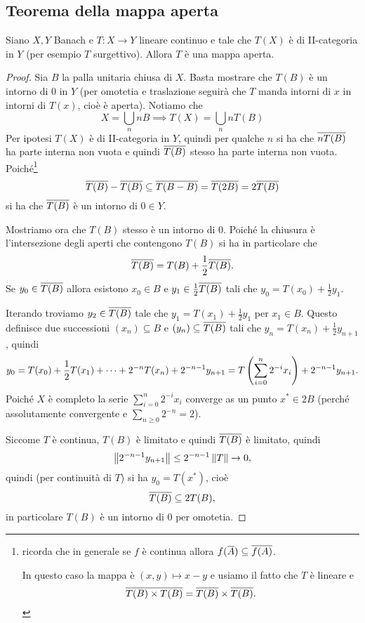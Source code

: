 \subsection{Teorema della mappa aperta}
\begin{theorem}\label{ThMappaAperta}
Siano $X,Y$ Banach e $T:X\to Y$ lineare continuo e tale che $T(X)$ \`e di II-categoria in $Y$ (per esempio $T$ surgettivo). Allora $T$ \`e una mappa aperta.
\end{theorem}
\begin{proof}
Sia $B$ la palla unitaria chiusa di $X$. Basta mostrare che $T(B)$ \`e un intorno di $0$ in $Y$ (per omotetia e traslazione seguir\`a che $T$ manda intorni di $x$ in intorni di $T(x)$, cio\`e \`e aperta). Notiamo che 
\[X=\bigcup_n nB\implies T(X)=\bigcup_n nT(B)\]
Per ipotesi $T(X)$ \`e di II-categoria in $Y$, quindi per qualche $n$ si ha che $\overline{n T(B)}$ ha parte interna non vuota e quindi $\overline{T(B)}$ stesso ha parte interna non vuota. Poich\'e\footnote{ricorda che in generale se $f$ \`e continua allora $f(\overline{A})\subseteq \overline{f(A)}$. 

In questo caso la mappa \`e $(x,y)\mapsto x-y$ e usiamo il fatto che $T$ \`e lineare e \[\overline{T(B)\times T(B)}=\overline{T(B)}\times \overline{T(B)}.\]} 
\[\overline{T(B)}-\overline{T(B)}\subseteq \overline{T(B-B)}=\overline{T(2B)}=2\overline{T(B)}\]
si ha che $\overline{T(B)}$ \`e un intorno di $0\in Y$.


Mostriamo ora che $T(B)$ stesso \`e un intorno di $0$. Poich\'e la chiusura \`e l'intersezione degli aperti che contengono $T(B)$ si ha in particolare che
\[\overline{T(B)}=T(B)+\frac12\overline{T(B)}.\]
Se $y_0\in\overline{T(B)}$ allora esistono $x_0\in B$ e $y_1\in \frac12\overline{T(B)}$ tali che $y_0=T(x_0)+\frac12 y_1$.

Iterando troviamo $y_2\in \overline{T(B)}$ tale che $y_1=T(x_1)+\frac12 y_1$ per $x_1\in B$. Questo definisce due successioni $(x_n)\subseteq B$ e $(y_n)\subseteq \overline{T(B)}$ tali che $y_n=T(x_n)+\frac12 y_{n+1}$, quindi
\[y_0=T(x_0)+\frac12 T(x_1)+\cdots+2^{-n}T(x_n)+2^{-n-1}y_{n+1}=T\left({\sum_{i=0}^n2^{-i}x_i}\right)+2^{-n-1}y_{n+1}.\]
Poich\'e $X$ \`e completo la serie $\sum_{i=0}^n2^{-i}x_i$ converge as un punto $x^\ast\in 2B$ (perch\'e assolutamente convergente e $\sum_{n\geq 0} 2^{-n}=2$). 

Siccome $T$ \`e continua, $T(B)$ \`e limitato e quindi $\overline{T(B)}$ \`e limitato, quindi 
\[\left\Vert{2^{-n-1}y_{n+1}}\right\Vert\leq 2^{-n-1}\left\Vert{T}\right\Vert\to 0,\]
quindi (per continuit\`a di $T$) si ha $y_0=T(x^\ast)$, cio\`e
\[\overline{T(B)}\subseteq 2T(B),\]
in particolare $T(B)$ \`e un intorno di $0$ per omotetia.
\end{proof}